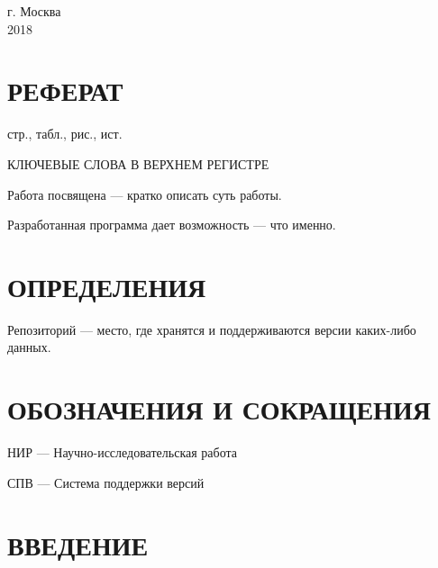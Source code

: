 \documentclass[a4paper,12pt]{article}
\newcounter{mycitecount}                                %
\begin{document}
\renewcommand{\arraystretch}{1}

\vfill

\begin{center}
г. Москва\\
2018
\end{center}

\pagebreak

\restoregeometry

\onehalfspacing


\thispagestyle{empty}

\section*{\centering РЕФЕРАТ}

 стр.,  табл.,  рис., \totalmycitecounts ист. 

КЛЮЧЕВЫЕ СЛОВА В ВЕРХНЕМ РЕГИСТРЕ

Работа посвящена --- кратко описать суть работы.

Разработанная программа дает возможность --- что именно.

\pagebreak
\thispagestyle{empty}

\section*{\centering ОПРЕДЕЛЕНИЯ}

Репозиторий --- место, где хранятся и поддерживаются версии каких-либо данных. 

\pagebreak

\section*{\centering ОБОЗНАЧЕНИЯ И СОКРАЩЕНИЯ}


НИР --- Научно-исследовательская работа

СПВ --- Система поддержки версий



\pagebreak



\tableofcontents

\pagebreak

\section*{\centering ВВЕДЕНИЕ}
\pagebreak
\end{document}
